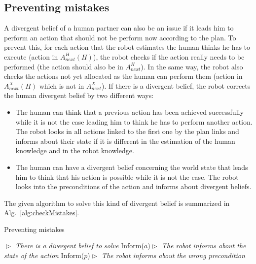 \documentclass[english,a4paper,11pt,twoside]{StyleThese}
\begin{document}
\subsection{Preventing mistakes}

A divergent belief of a human partner can also be an issue if it leads him to perform an action that should not be perform now according to the plan. To prevent this, for each action that the robot estimates the human thinks he has to execute (action in $A^H_{next}(H)$), the robot checks if the action really needs to be performed (the action should also be in $A^H_{next}$). In the same way, the robot also checks the actions not yet allocated as the human can perform them (action in $A^X_{next}(H)$ which is not in $A^X_{next}$). If there is a divergent belief, the robot corrects the human divergent belief by two different ways:
\begin{itemize}
\item The human can think that a previous action has been achieved successfully while it is not the case leading him to think he has to perform another action. The robot looks in all actions linked to the first one by the plan links and informs about their state if it is different in the estimation of the human knowledge and in the robot knowledge.
\item The human can have a divergent belief concerning the world state that leads him to think that his action is possible while it is not the case. The robot looks into the preconditions of the action and informs about divergent beliefs.
\end{itemize}
The given algorithm to solve this kind of divergent belief is summarized in Alg.~\ref{alg:checkMistakes}.


\begin{algorithm}
\caption{Preventing mistakes}
\label{alg:checkMistakes}
\begin{algorithmic}
\STATE \hfill \textit{$\vartriangleright$ There is a divergent belief to solve}
\STATE Inform($a$)\hfill \textit{$\vartriangleright$ The robot informs about the state of the action}
\ENDIF
{}
\STATE Inform($p$)\hfill \textit{$\vartriangleright$ The robot informs about the wrong precondition}
\ENDIF
\ENDIF
\end{algorithmic}
\end{algorithm} 
\end{document}
